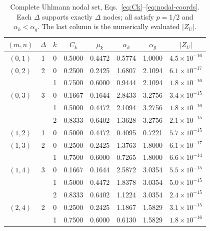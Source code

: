 \documentclass[11pt]{article}
\begin{document}
\begin{table}[htbp]\centering
\caption{Complete Uhlmann nodal set, Eqs.~\eqref{eq:Ck}--\eqref{eq:nodal-coords}.
Each $\Delta$ supports exactly $\Delta$ nodes; all satisfy $p=1/2$ and
$\alpha_k<\alpha_g$. The last column is the numerically evaluated $|Z_U|$.}
\label{tab:nodes}
\begin{tabular}{cccccccc}
\toprule
$(m,n)$ & $\Delta$ & $k$ & $C_k$ & $\mu_k$ & $\alpha_k$ & $\alpha_g$ & $|Z_U|$\\
\midrule
$(0,1)$ & 1 & 0 & 0.5000 & 0.4472 & 0.5774 & 1.0000 & $4.5\times10^{-16}$\\
\midrule
$(0,2)$ & 2 & 0 & 0.2500 & 0.2425 & 1.6807 & 2.1094 & $6.1\times10^{-17}$\\
        &   & 1 & 0.7500 & 0.6000 & 0.9444 & 2.1094 & $1.8\times10^{-16}$\\
\midrule
$(0,3)$ & 3 & 0 & 0.1667 & 0.1644 & 2.8433 & 3.2756 & $3.4\times10^{-15}$\\
        &   & 1 & 0.5000 & 0.4472 & 2.1094 & 3.2756 & $1.8\times10^{-16}$\\
        &   & 2 & 0.8333 & 0.6402 & 1.3628 & 3.2756 & $2.1\times10^{-15}$\\
\midrule
$(1,2)$ & 1 & 0 & 0.5000 & 0.4472 & 0.4095 & 0.7221 & $5.7\times10^{-15}$\\
\midrule
$(1,3)$ & 2 & 0 & 0.2500 & 0.2425 & 1.3763 & 1.8000 & $6.1\times10^{-17}$\\
        &   & 1 & 0.7500 & 0.6000 & 0.7265 & 1.8000 & $6.6\times10^{-14}$\\
\midrule
$(1,4)$ & 3 & 0 & 0.1667 & 0.1644 & 2.5872 & 3.0354 & $5.5\times10^{-15}$\\
        &   & 1 & 0.5000 & 0.4472 & 1.8378 & 3.0354 & $5.0\times10^{-15}$\\
        &   & 2 & 0.8333 & 0.6402 & 1.1224 & 3.0354 & $2.4\times10^{-15}$\\
\midrule
$(2,4)$ & 2 & 0 & 0.2500 & 0.2425 & 1.1867 & 1.5829 & $3.1\times10^{-15}$\\
        &   & 1 & 0.7500 & 0.6000 & 0.6130 & 1.5829 & $1.8\times10^{-16}$\\
\bottomrule
\end{tabular}
\end{table}
\end{document}

